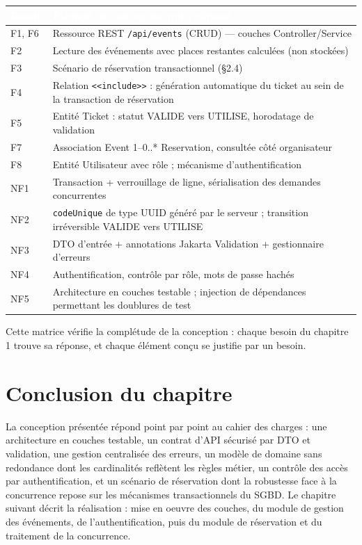 \documentclass[12pt,a4paper]{report}
\newcommand{\code}[1]{\textcolor{codecolor}{\texttt{#1}}}
\begin{document}
\begin{center}\small
\begin{longtable}{|p{7.50cm}|p{7.50cm}|}
\hline
\rowcolor{entetetable}
\textbf{\textcolor{white}{Besoin}} & \textbf{\textcolor{white}{Élément de conception qui y répond}} \\ \hline
F1, F6 & Ressource REST \code{/api/events} (CRUD) — couches Controller/Service \\ \hline
F2 & Lecture des événements avec places restantes calculées (non stockées) \\ \hline
F3 & Scénario de réservation transactionnel (§2.4) \\ \hline
F4 & Relation \code{<<include>>} : génération automatique du ticket au sein de la transaction de réservation \\ \hline
F5 & Entité Ticket : statut VALIDE  vers  UTILISE, horodatage de validation \\ \hline
F7 & Association Event 1–0..* Reservation, consultée côté organisateur \\ \hline
F8 & Entité Utilisateur avec rôle ; mécanisme d'authentification \\ \hline
NF1 & Transaction + verrouillage de ligne, sérialisation des demandes concurrentes \\ \hline
NF2 & \code{codeUnique} de type UUID généré par le serveur ; transition irréversible VALIDE  vers  UTILISE \\ \hline
NF3 & DTO d'entrée + annotations Jakarta Validation + gestionnaire d'erreurs \\ \hline
NF4 & Authentification, contrôle par rôle, mots de passe hachés \\ \hline
NF5 & Architecture en couches testable ; injection de dépendances permettant les doublures de test \\ \hline
\end{longtable}\end{center}

Cette matrice vérifie la complétude de la conception : chaque besoin du chapitre 1 trouve sa réponse, et chaque élément conçu se justifie par un besoin.

\section{Conclusion du chapitre}

La conception présentée répond point par point au cahier des charges : une architecture en couches testable, un contrat d'API sécurisé par DTO et validation, une gestion centralisée des erreurs, un modèle de domaine sans redondance dont les cardinalités reflètent les règles métier, un contrôle des accès par authentification, et un scénario de réservation dont la robustesse face à la concurrence repose sur les mécanismes transactionnels du SGBD. Le chapitre suivant décrit la réalisation : mise en oeuvre des couches, du module de gestion des événements, de l'authentification, puis du module de réservation et du traitement de la concurrence.
\end{document}
